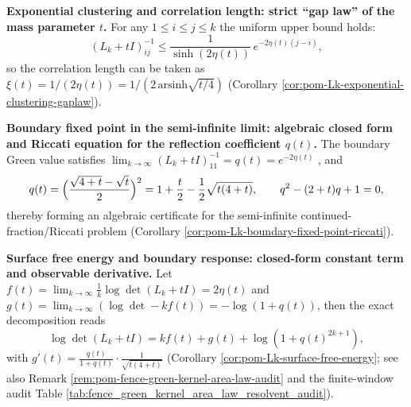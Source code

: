     \item \textbf{Exponential clustering and correlation length: strict ``gap law'' of the mass parameter \texorpdfstring{\(t\)}{t}.}
    For any \(1\le i\le j\le k\) the uniform upper bound holds:
    \[
    (L_k+tI)^{-1}_{ij}\le \frac{1}{\sinh(2\eta(t))}\,e^{-2\eta(t)(j-i)},
    \]
    so the correlation length can be taken as
    \(
    \xi(t)=1/(2\eta(t))=1/(2\,\mathrm{arsinh}\sqrt{t/4})
    \)
    (Corollary \ref{cor:pom-Lk-exponential-clustering-gaplaw}).

    \item \textbf{Boundary fixed point in the semi-infinite limit: algebraic closed form and Riccati equation for the reflection coefficient \texorpdfstring{\(q(t)\)}{q(t)}.}
    The boundary Green value satisfies
    \(
    \lim_{k\to\infty}(L_k+tI)^{-1}_{11}=q(t)=e^{-2\eta(t)}
    \)
    , and
    \[
    q(t)=\Bigl(\frac{\sqrt{4+t}-\sqrt{t}}{2}\Bigr)^2
    =1+\frac{t}{2}-\frac12\sqrt{t(4+t)},
    \qquad
    q^2-(2+t)q+1=0,
    \]
    thereby forming an algebraic certificate for the semi-infinite continued-fraction/Riccati problem (Corollary \ref{cor:pom-Lk-boundary-fixed-point-riccati}).

    \item \textbf{Surface free energy and boundary response: closed-form constant term and observable derivative.}
    Let
    \(f(t)=\lim_{k\to\infty}\frac1k\log\det(L_k+tI)=2\eta(t)\)
    and
    \(g(t)=\lim_{k\to\infty}(\log\det-k f(t))=-\log(1+q(t))\), then the exact decomposition reads
    \[
    \log\det(L_k+tI)=k f(t)+g(t)+\log(1+q(t)^{2k+1}),
    \]
    with
    \(
    g'(t)=\frac{q(t)}{1+q(t)}\cdot \frac{1}{\sqrt{t(4+t)}}
    \)
    (Corollary \ref{cor:pom-Lk-surface-free-energy}; see also Remark \ref{rem:pom-fence-green-kernel-area-law-audit} and the finite-window audit Table \ref{tab:fence_green_kernel_area_law_resolvent_audit}).

